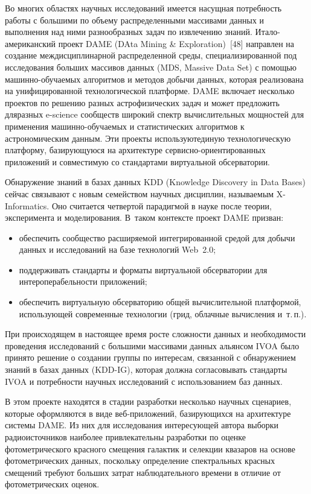\begin{multicols}{2}
      Во многих областях научных исследований имеется насущная потребность работы с 
большими по объему распределенными массивами данных и выполнения над ними 
разнообразных задач по извлечению знаний. Ита\-ло-аме\-ри\-кан\-ский проект DAME 
({DAta Mining} \& {Exploration})~[48] на\-правлен на создание междисциплинарной 
распределенной среды, специализированной под исследования больших массивов данных 
(MDS, {Massive Data Set}) с\linebreak
 помощью ма\-шин\-но-обуча\-емых алгоритмов и 
методов добычи данных, которая реализована на унифицированной технологической 
платформе. DAME включает несколько проектов по решению разных астрофизических 
задач и может предложить для\linebreak разных e-science сообществ широкий спектр 
вы\-чис\-ли\-тель\-ных мощ\-ностей для применения ма\-шин\-но-обуча\-емых и статистических 
алгоритмов к астрономическим данным. Эти проекты используют\linebreak единую технологическую 
платформу, ба\-зи\-ру\-ющу\-юся на архитектуре сер\-вис\-но-ориен\-ти\-ро\-ван\-ных приложений и 
совместимую со стандартами виртуальной обсерватории. 
  
  Обнаружение знаний в базах данных KDD ({Knowledge Discovery in Data Bases}) 
сейчас связывают с новым семейством научных дисциплин, называемым 
  X-Informatics. Оно считается четвертой парадигмой в науке после теории, 
эксперимента и моделирования. В~таком контексте проект DAME призван: 
  \begin{itemize}
\item обеспечить сообщество расширяемой интегрированной средой для добычи данных 
и исследований на базе технологий Web~2.0;
\item поддерживать стандарты и форматы виртуальной обсерватории для 
интероперабельности приложений;
\item обеспечить виртуальную обсерваторию общей вычислительной платформой, 
использующей современные технологии (грид, облачные вычисления и~т.\,п.). 
\end{itemize}

При происходящем в настоящее время росте сложности данных и необходимости 
проведения исследований с большими массивами данных альянсом IVOA было принято 
решение о создании группы по интересам, связанной с обнаружением знаний в базах данных 
(KDD-IG), которая должна согласовывать стандарты IVOA и потребности научных 
исследований с использованием баз данных.
      
      В этом проекте находятся в стадии разработки несколько научных сценариев, которые 
оформляются в виде веб-при\-ло\-же\-ний, базирующихся на архитектуре системы DAME. Из 
них для исследования интересующей автора выборки радиоисточников наиболее 
привлекательны разработки по оценке фотометрического красного смещения галактик и 
селекции квазаров на основе фотометрических данных, поскольку определение 
спектральных красных смещений требуют больших затрат наблюдательного времени в 
отличие от фотометрических оценок.
      

\end{multicols}
